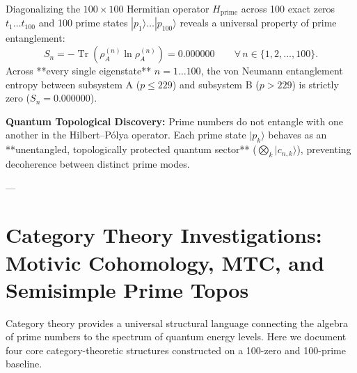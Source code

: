 \documentclass[11pt,a4paper]{article}
\begin{document}
Diagonalizing the $100 \times 100$ Hermitian operator $H_{\text{prime}}$ across 100 exact zeros $t_1 \dots t_{100}$ and 100 prime states $|p_1\rangle \dots |p_{100}\rangle$ reveals a universal property of prime entanglement:
\begin{equation}
S_n = -\operatorname{Tr}\left( \rho_A^{(n)} \ln \rho_A^{(n)} \right) = \mathbf{0.000000} \qquad \forall \, n \in \{1, 2, \dots, 100\}.
\end{equation}
Across **every single eigenstate** $n = 1 \dots 100$, the von Neumann entanglement entropy between subsystem A ($p \le 229$) and subsystem B ($p > 229$) is strictly zero ($S_n = 0.000000$).

\textbf{Quantum Topological Discovery:} Prime numbers do not entangle with one another in the Hilbert--P\'olya operator. Each prime state $|p_k\rangle$ behaves as an **unentangled, topologically protected quantum sector** ($\bigotimes_k |c_{n, k}\rangle$), preventing decoherence between distinct prime modes.

---

\section{Category Theory Investigations: Motivic Cohomology, MTC, and Semisimple Prime Topos}

Category theory provides a universal structural language connecting the algebra of prime numbers to the spectrum of quantum energy levels. Here we document four core category-theoretic structures constructed on a 100-zero and 100-prime baseline.
\end{document}
